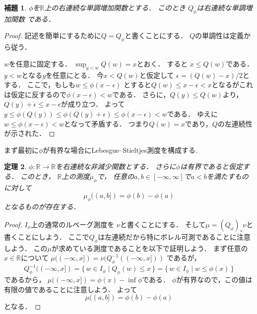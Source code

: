 \documentclass[leqno, a4paper, 12pt]{jsarticle}
\newtheorem{thm}{定理}
\newtheorem{lem}[thm]{補題}
\newcommand{\rr}{\mathbb{R}}
\begin{document}
\begin{lem}
$\phi$を$\rr$上の右連続な単調増加関数とする．
このとき
$Q_{\phi}$は右連続な単調増加関数
である．
\end{lem}
\begin{proof}
記述を簡単にするために$Q=Q_{\phi}$と書くことにする．
$Q$の単調性は定義から従う．

$w$を任意に固定する．
$\sup_{y<w}Q(w)=x$とおく．
すると
$x\le Q(w)$である．
$y<w$となる$y$を任意にとる．
今$x<Q(w)$と仮定して
$\epsilon=(Q(w)-x)/2$とする．
ここで，もしも$w\le \phi(x-\epsilon)$
とすると$Q(w)\le x-\epsilon<x$となるがこれは仮定に反するので$\phi(x-\epsilon)<w$である．
さらに，$Q(y)\le Q(w)$より，
$Q(y)+\epsilon\le x-\epsilon$が成り立つ．
よって
$y\le  \phi(Q(y))\le \phi(Q(y)+\epsilon)
\le 
\phi(x-\epsilon)<w$である．
ゆえに$w\le \phi(x-\epsilon)<w$となって矛盾する．
つまり$Q(w)=x$であり，$Q$の左連続性が示された．
\end{proof}

まず最初に$\phi$が有界な場合にLebesgue--Stieltjes測度を構成する.
\begin{thm}
$\phi:\rr\to \rr$を右連続な非減少関数とする．
さらに$\phi$は有界であると仮定する．
このとき，
$\rr$上の測度$\mu_{\phi}$で，
任意の$a, b\in [-\infty, \infty]$で$a<b$を満たすものに対して
\[
\mu_{\phi}((a, b])=\phi(b)-\phi(a)
\]
となるものが存在する．
\end{thm}
\begin{proof}
$I_{\phi}$上の通常のルベーグ測度を
$\nu$と書くことにする．
そして$\mu=(Q_{\phi})_{*}\nu$と書くことにしよう．
ここで$Q_{\phi}$は左連続だから特にボレル可測であることに注意しよう．
この$\mu$が求めている測度であることを以下で証明しよう．
まず任意の$x\in \rr$について
$\mu((-\infty, x])=
\nu(Q_{\phi}^{-1}((-\infty, x]))
$
であるが，
\[
Q_{\phi}^{-1}((-\infty, x])
=
\{\, w\in I_{\phi}\mid Q_{\phi}(w)\le x\, \}
=\{\, w\in I_{\phi}\mid w\le \phi(x)\, \}
\]
であるから，
$\mu((-\infty, x])=\phi(x)-\inf \phi$である．
$\phi$が有界なので，この値は有限の値であることに注意しよう．
よって
\[
\mu((a, b])=\phi(b)-\phi(a)
\]
となる．
\end{proof}
\end{document}
